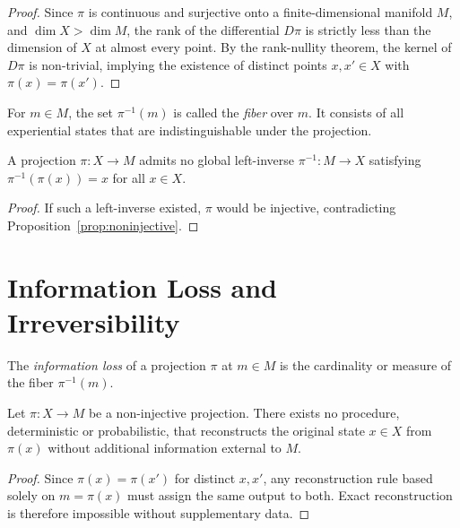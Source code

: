 \documentclass[11pt,openany]{book}
\begin{document}
\begin{proof}
Since $\pi$ is continuous and surjective onto a
finite-dimensional manifold $M$, and $\dim X > \dim M$,
the rank of the differential $D\pi$ is strictly less than
the dimension of $X$ at almost every point. By the
rank-nullity theorem, the kernel of $D\pi$ is non-trivial,
implying the existence of distinct points $x, x' \in X$
with $\pi(x) = \pi(x')$.
\end{proof}

\begin{definition}[Fiber]
For $m \in M$, the set $\pi^{-1}(m)$ is called the
\emph{fiber} over $m$. It consists of all experiential
states that are indistinguishable under the projection.
\end{definition}

\begin{proposition}
\label{prop:noninvertible}
A projection $\pi : X \to M$ admits no global left-inverse
$\pi^{-1} : M \to X$ satisfying
$\pi^{-1}(\pi(x)) = x$ for all $x \in X$.
\end{proposition}

\begin{proof}
If such a left-inverse existed, $\pi$ would be injective,
contradicting Proposition~\ref{prop:noninjective}.
\end{proof}

\section{Information Loss and Irreversibility}
\label{sec:information-loss}

\begin{definition}
The \emph{information loss} of a projection $\pi$ at
$m \in M$ is the cardinality or measure of the fiber
$\pi^{-1}(m)$.
\end{definition}

\begin{proposition}
\label{prop:irreversibility}
Let $\pi : X \to M$ be a non-injective projection. There
exists no procedure, deterministic or probabilistic, that
reconstructs the original state $x \in X$ from $\pi(x)$
without additional information external to $M$.
\end{proposition}

\begin{proof}
Since $\pi(x) = \pi(x')$ for distinct $x, x'$, any
reconstruction rule based solely on $m = \pi(x)$ must
assign the same output to both. Exact reconstruction is
therefore impossible without supplementary data.
\end{proof}
\end{document}
